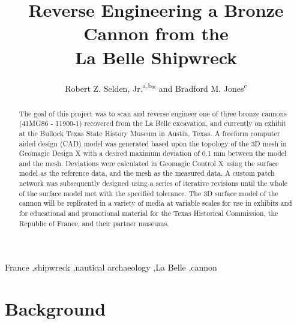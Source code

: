 \documentclass[review]{elsarticle}
\begin{document}
\begin{frontmatter}

\title{Reverse Engineering a Bronze Cannon from the\\La Belle Shipwreck}

\author{Robert Z. Selden, Jr.\textsuperscript{a,b}* and Bradford M. Jones\textsuperscript{c}}
\address[1]{Heritage Research Center, Stephen F. Austin State University, USA}
\address[2]{Cultural Heritage Department, Jean Monnet University, FR}
\address[3]{Archeology Division, Texas Historical Commission, Austin, USA}

\begin{abstract}
The goal of this project was to scan and reverse engineer one of three bronze cannons (41MG86 - 11900-1) recovered from the La Belle excavation, and currently on exhibit at the Bullock Texas State History Museum in Austin, Texas. A freeform computer aided design (CAD) model was generated based upon the topology of the 3D mesh in Geomagic Design X with a desired maximum deviation of 0.1 mm between the model and the mesh. Deviations were calculated in Geomagic Control X using the surface model as the reference data, and the mesh as the measured data. A custom patch network was subsequently designed using a series of iterative revisions until the whole of the surface model met with the specified tolerance. The 3D surface model of the cannon will be replicated in a variety of media at variable scales for use in exhibits and for educational and promotional material for the Texas Historical Commission, the Republic of France, and their partner museums.
\end{abstract}

\begin{keyword}
France \sep shipwreck \sep nautical archaeology \sep La Belle \sep cannon


\end{keyword}

\end{frontmatter}

\linenumbers

\section*{Background}
\end{document}
